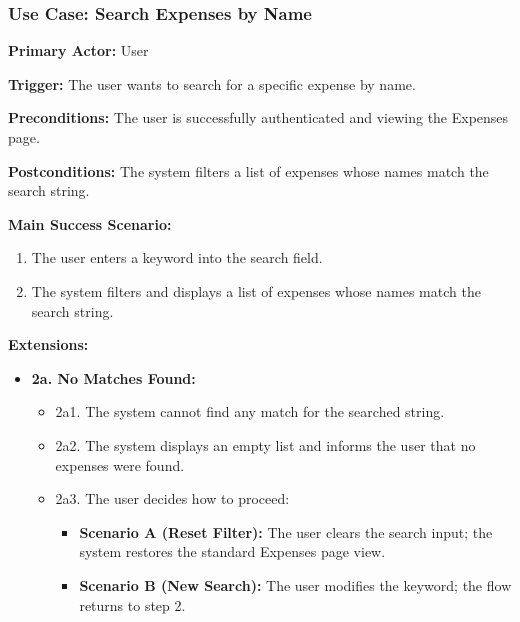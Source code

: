 \subsubsection{\textbf{Use Case: Search Expenses by Name}}

\textbf{Primary Actor:} User

\textbf{Trigger:} The user wants to search for a specific expense by name.

\textbf{Preconditions:} The user is successfully authenticated and viewing the Expenses page.

\textbf{Postconditions:} The system filters a list of expenses whose names match the search string.

\vspace{1.5cm}

\textbf{Main Success Scenario:}

\begin{enumerate} [leftmargin=0.75cm, noitemsep]
\item The user enters a keyword into the search field.
\item The system filters and displays a list of expenses whose names match the search string.
\end{enumerate}

\vspace{0.3cm}

\textbf{Extensions:}

\begin{itemize} [label={}, leftmargin=0.75cm, noitemsep]

\item \textbf{2a. No Matches Found:}
\begin{itemize} [label={}, leftmargin=0.75cm, noitemsep]
    \item 2a1. The system cannot find any match for the searched string.
    \item 2a2. The system displays an empty list and informs the user that no expenses were found.
    \item 2a3. The user decides how to proceed:
    \begin{itemize} [label={}, leftmargin=0.75cm, noitemsep]
        \item \textbf{Scenario A (Reset Filter):} The user clears the search input; the system restores the standard Expenses page view.
        \item \textbf{Scenario B (New Search):} The user modifies the keyword; the flow returns to step 2.
    \end{itemize}
\end{itemize}

\end{itemize}

\vspace{0.3cm}
